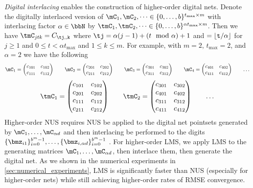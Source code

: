 \documentclass[acmsmall]{acmart}
\begin{document}
\emph{Digital interlacing} enables the construction of higher-order digital nets. Denote the digitally interlaced version of $\mC_1,\mC_2,\dots \in \{0,\dots,b\}^{t_\mathrm{max} \times m}$ with interlacing factor $\alpha \in \bbN$ by $\tmC_1,\tmC_2,\dots \in \{0,\dots,b\}^{\alpha t_\mathrm{max} \times m}$. Then we have $\tmC_{jtk} = C_{\tj,\tt,k}$ where $\tj = \alpha (j-1) + (t \mod \alpha) + 1$ and $\tt = \lfloor t / \alpha \rfloor$ for $j \geq 1$ and $0 \leq t < \alpha t_\mathrm{max}$ and $1 \leq k \leq m$. For example, with $m=2$, $t_\mathrm{max}=2$, and $\alpha=2$ we have the following 
$$\mC_1 = \begin{pmatrix} c_{101} & c_{102} \\ c_{111} & c_{112} \end{pmatrix} \qquad \mC_2 = \begin{pmatrix} c_{201} & c_{202} \\ c_{211} & c_{212} \end{pmatrix} \qquad \mC_3 = \begin{pmatrix} c_{301} & c_{302} \\ c_{311} & c_{312} \end{pmatrix} \qquad \mC_4 = \begin{pmatrix} c_{401} & c_{402} \\ c_{411} & c_{412} \end{pmatrix} \qquad \dots$$
$$\tmC_1 = \begin{pmatrix} c_{101} & c_{102} \\ c_{201} & c_{202} \\ c_{111} & c_{112} \\ c_{211} & c_{212} \end{pmatrix} \qquad \tmC_2 = \begin{pmatrix} c_{301} & c_{302} \\ c_{401} & c_{402} \\ c_{311} & c_{312} \\ c_{411} & c_{412}\end{pmatrix} \qquad \dots$$
Higher-order NUS requires NUS be applied to the digital net pointsets generated by $\mC_1,\dots,\mC_{\alpha d}$ and then interlacing be performed to the digits $\{\bmz_{i1}\}_{i=0}^{b^m-1},\dots,\{\bmz_{i,\alpha d}\}_{i=0}^{b^m-1}$ \citep{dick.higher_order_scrambled_digital_nets}. For higher-order LMS, we apply LMS to the generating matrices $\mC_1,\dots,\mC_{\alpha d}$, then interlace them, then generate the digital net. As we shown in the numerical experiments in \cref{sec:numerical_experiments}, LMS is significantly faster than NUS (especially for higher-order nets) while still achieving higher-order rates of RMSE convergence. 
\end{document}
